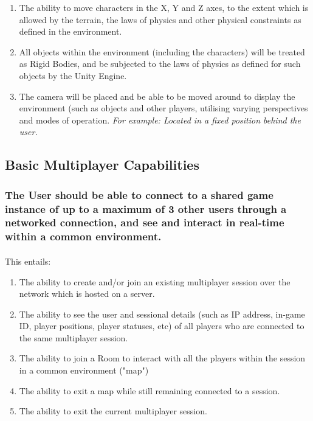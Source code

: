 \documentclass{article}
\begin{document}
\begin{enumerate}
  \item The ability to move characters in the X, Y and Z axes, to the extent which is allowed by the terrain, the laws of physics and other physical constraints as defined in the environment.
  \item All objects within the environment (including the characters) will be treated as Rigid Bodies, and be subjected to the laws of physics as defined for such objects by the Unity Engine.
  \item The camera will be placed and be able to be moved around to display the environment (such as objects and other players, utilising varying perspectives and modes of operation.
  \newline\textit{For example: Located in a fixed position behind the user.}
\end{enumerate}

\subsection{Basic Multiplayer Capabilities}
\subsubsection{\textbf{The User should be able to connect to a shared game instance of up to a maximum of 3 other users through a networked connection, and see and interact in real-time within a common environment.}}
\paragraph{}This entails:

\begin{enumerate}
  \item The ability to create and/or join an existing multiplayer session over the network which is hosted on a server.
  \item The ability to see the user and sessional details (such as IP address, in-game ID, player positions, player statuses, etc) of all players who are connected to the same multiplayer session.
  \item The ability to join a Room to interact with all the players within the session in a common environment ("map")
  \item The ability to exit a map while still remaining connected to a session.
  \item The ability to exit the current multiplayer session.
\end{enumerate}
\end{document}
